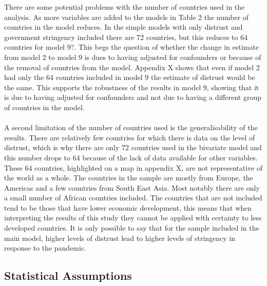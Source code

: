 \documentclass[
  11pt,
]{article}
\begin{document}
There are some potential problems with the number of countries used in the analysis. As more variables are added to the models in Table 2 the number of countries in the model reduces. In the simple models with only distrust and government stringency included there are 72 countries, but this reduces to 64 countries for model 9?. This begs the question of whether the change in estimate from model 2 to model 9 is dues to having adjusted for confounders or because of the removal of countries from the model. Appendix X shows that even if model 2 had only the 64 countries included in model 9 the estimate of distrust would be the same. This supports the robustness of the results in model 9, showing that it is due to having adjusted for confounders and not due to having a different group of countries in the model.\\
~\\
A second limitation of the number of countries used is the generalisability of the results. There are relatively few countries for which there is data on the level of distrust, which is why there are only 72 countries used in the bivariate model and this number drops to 64 because of the lack of data available for other variables. These 64 countries, highlighted on a map in appendix X, are not representative of the world as a whole. The countries in the sample are mostly from Europe, the Americas and a few countries from South East Asia. Most notably there are only a small number of African countries included. The countries that are not included tend to be those that have lower economic development, this means that when interpreting the results of this study they cannot be applied with certainty to less developed countries. It is only possible to say that for the sample included in the main model, higher levels of distrust lead to higher levels of stringency in response to the pandemic.\\

\hypertarget{statistical-assumptions}{%
\subsection{Statistical Assumptions}\label{statistical-assumptions}}
\end{document}
